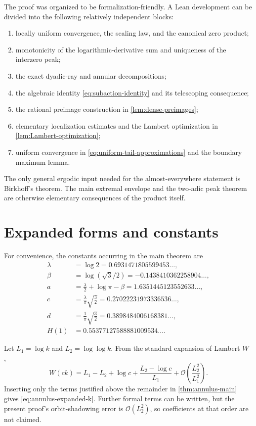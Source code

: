 \documentclass[11pt,oneside]{article}
\theoremstyle{definition}
\theoremstyle{remark}
\newcommand{\bigO}{\mathcal O}
\begin{document}
The proof was organized to be formalization-friendly.  A Lean development can
be divided into the following relatively independent blocks:
\begin{enumerate}
 \item locally uniform convergence, the scaling law, and the canonical zero
 product;
 \item monotonicity of the logarithmic-derivative sum and uniqueness of the
 interzero peak;
 \item the exact dyadic-ray and annular decompositions;
 \item the algebraic identity \eqref{eq:subaction-identity} and its telescoping
 consequence;
 \item the rational preimage construction in \cref{lem:dense-preimages};
 \item elementary localization estimates and the Lambert optimization in
 \cref{lem:Lambert-optimization};
 \item uniform convergence in \eqref{eq:uniform-tail-approximations} and the
 boundary maximum lemma.
\end{enumerate}
The only general ergodic input needed for the almost-everywhere statement is
Birkhoff's theorem.  The main extremal envelope and the two-adic peak theorem
are otherwise elementary consequences of the product itself.

\appendix

\section{Expanded forms and constants}
\label{app:constants}

For convenience, the constants occurring in the main theorem are
\begin{align*}
 \lambda&=\log2=0.6931471805599453\ldots,\\
 \beta&=\log(\sqrt3/2)=-0.1438410362258904\ldots,\\
 a&=\frac\lambda2+\log\pi-\beta
   =1.6351445123552633\ldots,\\
 c&=\frac{\lambda}{\pi}\sqrt{\frac32}
   =0.27022231973336536\ldots,\\
 d&=\frac1\pi\sqrt{\frac32}
   =0.3898484006168381\ldots,\\
 H(1)&=0.55377127588881009534\ldots.
\end{align*}

Let \(L_1=\log k\) and \(L_2=\log\log k\).  From the standard expansion of
Lambert \(W\) \cite{corless1996},
\[
 W(ck)=L_1-L_2+\log c
 +\frac{L_2-\log c}{L_1}
 +\bigO\!\left(\frac{L_2^2}{L_1^2}\right).
\]
Inserting only the terms justified above the remainder in
\cref{thm:annulus-main} gives \eqref{eq:annulus-expanded-k}.  Further formal
terms can be written, but the present proof's orbit-shadowing error is
\(\bigO(L_2^2)\), so coefficients at that order are not claimed.
\end{document}
